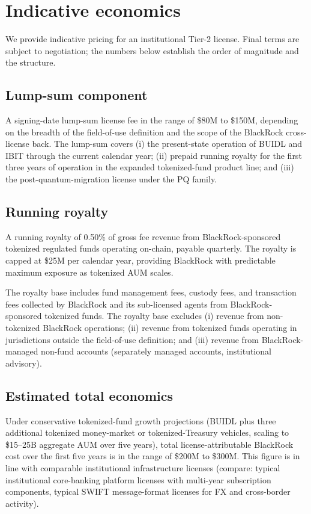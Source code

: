 \documentclass[11pt,letterpaper]{article}
\begin{document}
\section{Indicative economics}

We provide indicative pricing for an institutional Tier-2 license. Final terms are subject to negotiation; the numbers below establish the order of magnitude and the structure.

\subsection{Lump-sum component}

A signing-date lump-sum license fee in the range of \$80M to \$150M, depending on the breadth of the field-of-use definition and the scope of the BlackRock cross-license back. The lump-sum covers (i) the present-state operation of BUIDL and IBIT through the current calendar year; (ii) prepaid running royalty for the first three years of operation in the expanded tokenized-fund product line; and (iii) the post-quantum-migration license under the PQ family.

\subsection{Running royalty}

A running royalty of 0.50\% of gross fee revenue from BlackRock-sponsored tokenized regulated funds operating on-chain, payable quarterly. The royalty is capped at \$25M per calendar year, providing BlackRock with predictable maximum exposure as tokenized AUM scales.

The royalty base includes fund management fees, custody fees, and transaction fees collected by BlackRock and its sub-licensed agents from BlackRock-sponsored tokenized funds. The royalty base excludes (i) revenue from non-tokenized BlackRock operations; (ii) revenue from tokenized funds operating in jurisdictions outside the field-of-use definition; and (iii) revenue from BlackRock-managed non-fund accounts (separately managed accounts, institutional advisory).

\subsection{Estimated total economics}

Under conservative tokenized-fund growth projections (BUIDL plus three additional tokenized money-market or tokenized-Treasury vehicles, scaling to \$15--25B aggregate AUM over five years), total license-attributable BlackRock cost over the first five years is in the range of \$200M to \$300M. This figure is in line with comparable institutional infrastructure licenses (compare: typical institutional core-banking platform licenses with multi-year subscription components, typical SWIFT message-format licenses for FX and cross-border activity).
\end{document}
